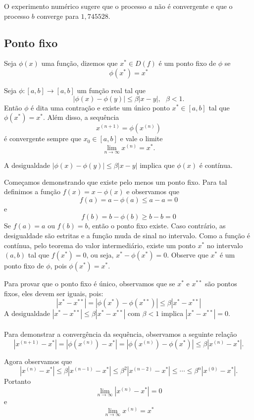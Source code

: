 \documentclass[main.tex]{subfiles}
\begin{document}
O experimento numérico sugere que o processo $a$ não é convergente e que o processo $b$ converge para $1,745528$.

\subsection{Ponto fixo}

Seja $\phi (x)$ uma função, dizemos que $x^*\in D(f)$ é um ponto fixo de $\phi$ se
$$\phi(x^*)=x^*$$

Seja $\phi:[a,b]\to [a,b]$ um função real tal que
$$|\phi(x)-\phi(y)|\leq \beta |x-y|,~~~\beta<1.$$
Então $\phi$ é dita uma contração e existe um único ponto $x^*\in [a,b]$ tal que $\phi(x^*)=x^*$. Além disso, a sequência
$$x^{(n+1)}=\phi(x^{(n)})$$
é convergente sempre que $x_0\in[a,b]$ e vale o limite $$\lim_{n\to\infty}x^{(n)}=x^*.$$

\begin{obs}
A desigualdade $|\phi(x)-\phi(y)|\leq \beta |x-y|$ implica que $\phi(x)$ é contínua.  
\end{obs}

Começamos demonstrando que existe pelo menos um ponto fixo. Para tal definimos a função $f(x)=x-\phi(x)$ e observamos que
$$f(a)=a-\phi(a)\leq a-a=0$$
e
$$f(b)=b-\phi(b)\geq b-b=0$$
Se $f(a)=a$ ou $f(b)=b$, então o ponto fixo existe. Caso contrário, as desigualdade são estritas e a função muda de sinal no intervalo. Como a função é contínua, pelo teorema do valor intermediário, existe um ponto $x^*$ no intervalo $(a,b)$ tal que $f(x^*)=0$, ou seja, $x^*-\phi(x^*)=0$. Observe que $x^*$ é um ponto fixo de $\phi$, pois $\phi(x^*)=x^*$. 

Para provar que o ponto fixo é único, observamos que se $x^*$ e $x^{**}$ são pontos fixos, eles devem ser iguais, pois:
$$|x^*-x^{**}|=|\phi(x^{*})-\phi(x^{**})|\leq \beta |x^*-x^{**}|$$
A desigualdade $|x^*-x^{**}|\leq \beta |x^*-x^{**}|$ com $\beta<1$ implica $|x^*-x^{**}|=0$.
\\~\\

Para demonstrar a convergência da sequência, observamos a seguinte relação
$$|x^{(n+1)}-x^*|=|\phi(x^{(n)})-x^*|=|\phi(x^{(n)})-\phi(x^*)|\leq \beta |x^{(n)}-x^*|.$$

Agora observamos que
$$|x^{(n)}-x^*|\leq  \beta |x^{(n-1)}-x^*|\leq \beta^2 |x^{(n-2)}-x^*|\leq \cdots \leq \beta^{n}|x^{(0)}-x^*|.$$
Portanto
$$\lim_{n\to\infty}|x^{(n)}-x^*|=0$$
e
$$\lim_{n\to\infty}x^{(n)}=x^*$$
\end{document}
